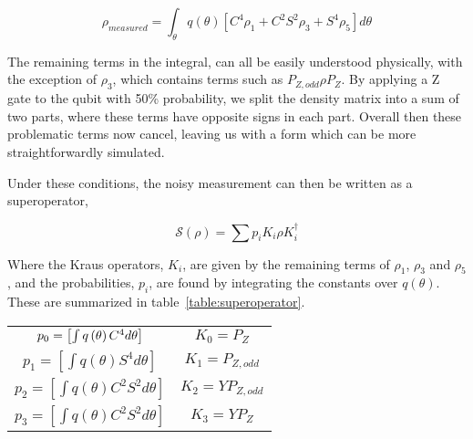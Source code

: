 \documentclass[prl, twocolumn, ,superscriptaddress]{revtex4-1}
\begin{document}

\[
\rho_{measured}  = \int_{\theta} q(\theta) \left[ C^{4} \rho_1 +C^{2}S^{2} \rho_3 + S^{4} \rho_5 \right] d\theta
\]
 
The remaining terms in the integral, can all be easily understood physically, with the exception of $\rho_3$, which contains terms such as $P_{Z,odd}\rho P_{Z}$. By applying a Z gate to the qubit with 50\% probability, we split the density matrix into a sum of two parts, where these terms have opposite signs in each part. Overall then these problematic terms now cancel, leaving us with a form which can be more straightforwardly simulated. 

Under these conditions, the noisy measurement can then be written as a superoperator,

\[
\mathcal{S}\left(\rho\right)=\sum p_{i}K_{i}\rho K_{i}^{\dagger}
\]

Where the Kraus operators, $K_i$, are given by the remaining terms of $\rho_1$, $\rho_3$ and $\rho_5$, and the probabilities, $p_i$, are found by integrating the constants over $q(\theta)$. These are summarized in table~\ref{table:superoperator}.

%
%
%
%
%
%
%
\label{table:superoperator}
\begin{tabular}{|c|c|}
\hline 
 & \tabularnewline
\hline
\hline 
$p_{0}=\mbox{\ensuremath{\left[\int q\left(\theta\right)C^{4}d\theta\right]}}$ & $K_{0}=P_{Z}$\tabularnewline
\hline 
$p_{1}=\left[\int q\left(\theta\right)S^{4}d\theta\right]$ & $K_{1}=P_{Z,odd}$\tabularnewline
\hline 
$p_{2}=\left[\int q\left(\theta\right)C^{2}S^{2}d\theta\right]$ & $K_{2}=YP_{Z,odd}$\tabularnewline
\hline 
$p_{3}=\left[\int q\left(\theta\right)C^{2}S^{2}d\theta\right]$ & $K_{3}=YP_{Z}$\tabularnewline
\hline
\end{tabular}
\end{document}

